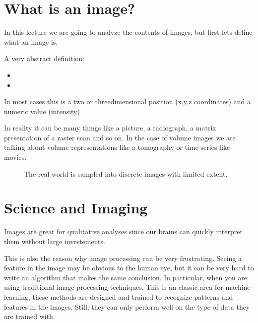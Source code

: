 \documentclass[letterpaper,10pt,english]{sphinxmanual}
\begin{document}
\section{What is an image?}
\label{\detokenize{ML4NeutronImageSegmentation:what-is-an-image}}
In this lecture we are going to analyze the contents of images, but first lets define what an image is.

A very abstract definition:
\begin{itemize}
\item {} 

\item {} 

\end{itemize}

In most cases this is a two\sphinxhyphen{} or three\sphinxhyphen{}dimensional position (x,y,z coordinates) and a numeric value (intensity)


In reality it can be many things like a picture, a radiograph, a matrix presentation of a raster scan and so on. In the case of volume images we are talking about volume representations like a tomography or time series like movies.

\begin{figure}[htbp]
\centering
\capstart

\noindent{}
\caption{The real world is sampled into discrete images with limited extent.}\label{\detokenize{ML4NeutronImageSegmentation:id2}}\end{figure}


\section{Science and Imaging}
\label{\detokenize{ML4NeutronImageSegmentation:science-and-imaging}}
Images are great for qualitative analyses since our brains can quickly interpret them without large  investements.

This is also the reason why image processing can be very frustrating. Seeing a feature in the image may be obvious to the human eye, but it can be very hard to write an algorithm that makes the same conclusion. In particular, when you are using traditional image processing techniques. This is an classic area for machine learning, these methods are designed and trained to recognize patterns and features in the images. Still, they can only perform well on the type of data they are trained with.
\end{document}
